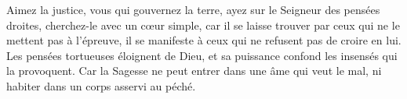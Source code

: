 Aimez la justice, vous qui gouvernez la terre,
	ayez sur le Seigneur des pensées droites, cherchez-le avec un cœur simple,
	car il se laisse trouver par ceux qui ne le mettent pas à l’épreuve,
	il se manifeste à ceux qui ne refusent pas de croire en lui.
Les pensées tortueuses éloignent de Dieu,
	et sa puissance confond les insensés qui la provoquent.
Car la Sagesse ne peut entrer dans une âme qui veut le mal,
	ni habiter dans un corps asservi au péché.
